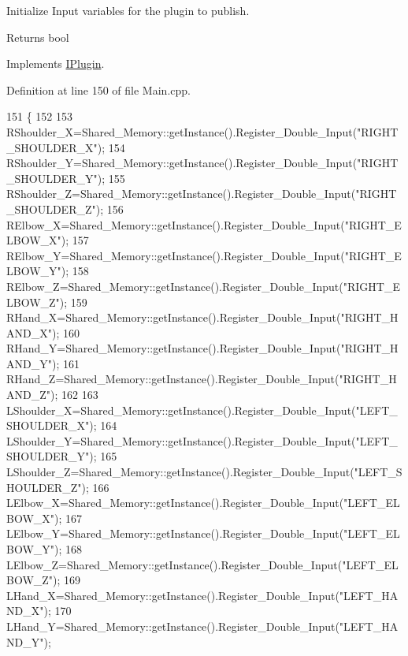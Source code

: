Initialize Input variables for the plugin to publish. 

\begin{DoxyReturn}{Returns}
bool 
\end{DoxyReturn}


Implements \hyperlink{class_i_plugin_aa7c66743ad956d8ada57becee559af4d}{I\+Plugin}.



Definition at line 150 of file Main.\+cpp.


\begin{DoxyCode}
151 \{
152 
153     RShoulder\_X=Shared\_Memory::getInstance().Register\_Double\_Input(\textcolor{stringliteral}{"RIGHT\_SHOULDER\_X"});
154     RShoulder\_Y=Shared\_Memory::getInstance().Register\_Double\_Input(\textcolor{stringliteral}{"RIGHT\_SHOULDER\_Y"});
155     RShoulder\_Z=Shared\_Memory::getInstance().Register\_Double\_Input(\textcolor{stringliteral}{"RIGHT\_SHOULDER\_Z"});
156     RElbow\_X=Shared\_Memory::getInstance().Register\_Double\_Input(\textcolor{stringliteral}{"RIGHT\_ELBOW\_X"});
157     RElbow\_Y=Shared\_Memory::getInstance().Register\_Double\_Input(\textcolor{stringliteral}{"RIGHT\_ELBOW\_Y"});
158     RElbow\_Z=Shared\_Memory::getInstance().Register\_Double\_Input(\textcolor{stringliteral}{"RIGHT\_ELBOW\_Z"});
159     RHand\_X=Shared\_Memory::getInstance().Register\_Double\_Input(\textcolor{stringliteral}{"RIGHT\_HAND\_X"});
160     RHand\_Y=Shared\_Memory::getInstance().Register\_Double\_Input(\textcolor{stringliteral}{"RIGHT\_HAND\_Y"});
161     RHand\_Z=Shared\_Memory::getInstance().Register\_Double\_Input(\textcolor{stringliteral}{"RIGHT\_HAND\_Z"});
162 
163     LShoulder\_X=Shared\_Memory::getInstance().Register\_Double\_Input(\textcolor{stringliteral}{"LEFT\_SHOULDER\_X"});
164     LShoulder\_Y=Shared\_Memory::getInstance().Register\_Double\_Input(\textcolor{stringliteral}{"LEFT\_SHOULDER\_Y"});
165     LShoulder\_Z=Shared\_Memory::getInstance().Register\_Double\_Input(\textcolor{stringliteral}{"LEFT\_SHOULDER\_Z"});
166     LElbow\_X=Shared\_Memory::getInstance().Register\_Double\_Input(\textcolor{stringliteral}{"LEFT\_ELBOW\_X"});
167     LElbow\_Y=Shared\_Memory::getInstance().Register\_Double\_Input(\textcolor{stringliteral}{"LEFT\_ELBOW\_Y"});
168     LElbow\_Z=Shared\_Memory::getInstance().Register\_Double\_Input(\textcolor{stringliteral}{"LEFT\_ELBOW\_Z"});
169     LHand\_X=Shared\_Memory::getInstance().Register\_Double\_Input(\textcolor{stringliteral}{"LEFT\_HAND\_X"});
170     LHand\_Y=Shared\_Memory::getInstance().Register\_Double\_Input(\textcolor{stringliteral}{"LEFT\_HAND\_Y"});

\end{DoxyCode}
